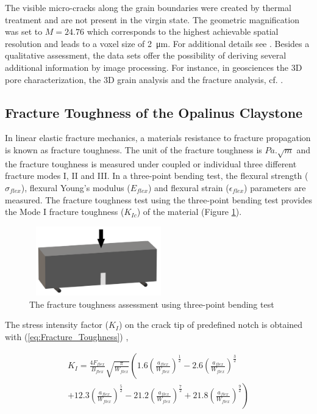The visible micro-cracks along the grain boundaries were created by thermal treatment and are not present in the virgin state.  The geometric magnification was set to $M = 24.76$ which corresponds to the highest achievable spatial resolution and leads to a voxel size of \SI{2}{\micro\meter}. For additional details see \textcolor{red}{\cite{Ruf2020}}. Besides a qualitative assessment, the data sets offer the possibility of deriving several additional information by image processing. For instance, in geosciences the 3D pore characterization, the 3D grain analysis and the fracture analysis, cf. \cite{Cnudde2013}. 

\subsection{Fracture Toughness of the Opalinus Claystone}
\label{sec:Fracture_Toughness_Exp}
In linear elastic fracture mechanics, a materials resistance to fracture propagation is known as fracture toughness. The unit of the fracture toughness is $Pa.\sqrt m$ and the fracture toughness is measured under coupled or individual three different fracture modes I, II and III. In a three-point bending test, the flexural strength ($\sigma_{flex}$), flexural Young's modulus ($E_{flex}$) and flexural strain ($\epsilon_{flex}$) parameters are measured. The fracture toughness test using the three-point bending test provides the Mode I fracture toughness ($K_{Ic}$) of the material (Figure \ref{fig:Amir_Fracture_Toughness_Theory}).

\begin{figure}[!ht]
\centering
\includegraphics[width=6cm,height=3cm]{figures/Amir_Fracture_Toughness_Theory.png}
\caption{The fracture toughness assessment using three-point bending test}
\label{fig:Amir_Fracture_Toughness_Theory}
\end{figure} 

The stress intensity factor ($K_I$) on the crack tip of predefined notch is obtained with (\ref{eq:Fracture_Toughness}) \cite{Bower2009},

\begin{multline}
\label{eq:Fracture_Toughness}
K_I=
\frac{4F_{flex}}{B_{flex}}
\sqrt{\frac{\pi}{W_{flex}}}
\left(1.6
\left(\frac{a_{flex}}{W_{flex}}\right)^\frac{1}{2}
-
2.6\left(\frac{a_{flex}}{W_{flex}}\right)^\frac{3}{2} 
\right.
\\ 
\left.
+12.3\left(\frac{a_{flex}}{W_{flex}}\right)^\frac{5}{2} -21.2\left(\frac{a_{flex}}{W_{flex}}\right)^\frac{7}{2}
+21.8\left(\frac{a_{flex}}{W_{flex}}\right)^\frac{9}{2}
\right)
\end{multline}

